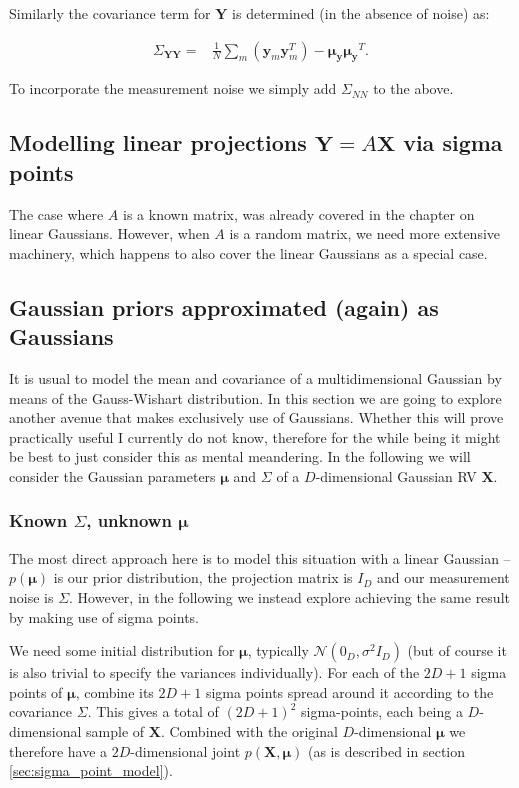 Similarly the covariance term for $\mathbf{Y}$ is determined (in
the absence of noise) as:

\begin{align}
\Sigma_{\mathbf{YY}}= & \frac{1}{N}\sum_{m}(\mathbf{y}_{m}\mathbf{y}_{m}^{T})-\mathbf{\mu_{y}}\mathbf{\mu_{y}}^{T}.
\end{align}


To incorporate the measurement noise we simply add $\Sigma_{NN}$
to the above.


\subsection{Modelling linear projections $\mathbf{Y}=A\mathbf{X}$ via sigma
points}

The case where $A$ is a known matrix, was already covered in the
chapter on linear Gaussians. However, when $A$ is a random matrix,
we need more extensive machinery, which happens to also cover the
linear Gaussians as a special case.


\subsection{Gaussian priors approximated (again) as Gaussians}

It is usual to model the mean and covariance of a multidimensional
Gaussian by means of the Gauss-Wishart distribution. In this section
we are going to explore another avenue that makes exclusively use
of Gaussians. Whether this will prove practically useful I currently
do not know, therefore for the while being it might be best to just
consider this as mental meandering. In the following we will consider
the Gaussian parameters $\mathbf{\mu}$ and $\Sigma$ of a $D$-dimensional
Gaussian RV $\mathbf{X}$.


\subsubsection{Known $\Sigma$, unknown $\mathbf{\mu}$}

The most direct approach here is to model this situation with a linear
Gaussian -- $p(\mathbf{\mu})$ is our prior distribution, the projection
matrix is $I_{D}$ and our measurement noise is $\Sigma$. However,
in the following we instead explore achieving the same result by making
use of sigma points.

We need some initial distribution for $\mathbf{\mu}$, typically $\mathcal{N}(0_{D},\sigma^{2}I_{D})$
(but of course it is also trivial to specify the variances individually).
For each of the $2D+1$ sigma points of $\mathbf{\mu}$, combine its
$2D+1$ sigma points spread around it according to the covariance
$\Sigma$. This gives a total of $(2D+1)^{2}$ sigma-points, each
being a $D$-dimensional sample of $\mathbf{X}$. Combined with the
original $D$-dimensional $\mathbf{\mu}$ we therefore have a $2D$-dimensional
joint $p(\mathbf{X},\mathbf{\mu})$ (as is described in section \ref{sec:sigma_point_model}).


